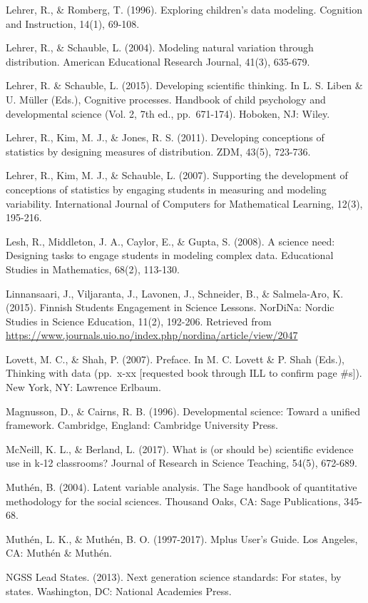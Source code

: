\documentclass[]{book}
\theoremstyle{definition}
\theoremstyle{definition}
\theoremstyle{definition}
\theoremstyle{remark}
\begin{document}
Lehrer, R., \& Romberg, T. (1996). Exploring children's data modeling.
Cognition and Instruction, 14(1), 69-108.

Lehrer, R., \& Schauble, L. (2004). Modeling natural variation through
distribution. American Educational Research Journal, 41(3), 635-679.

Lehrer, R. \& Schauble, L. (2015). Developing scientific thinking. In L.
S. Liben \& U. Müller (Eds.), Cognitive processes. Handbook of child
psychology and developmental science (Vol. 2, 7th ed., pp.~671-174).
Hoboken, NJ: Wiley.

Lehrer, R., Kim, M. J., \& Jones, R. S. (2011). Developing conceptions
of statistics by designing measures of distribution. ZDM, 43(5),
723-736.

Lehrer, R., Kim, M. J., \& Schauble, L. (2007). Supporting the
development of conceptions of statistics by engaging students in
measuring and modeling variability. International Journal of Computers
for Mathematical Learning, 12(3), 195-216.

Lesh, R., Middleton, J. A., Caylor, E., \& Gupta, S. (2008). A science
need: Designing tasks to engage students in modeling complex data.
Educational Studies in Mathematics, 68(2), 113-130.

Linnansaari, J., Viljaranta, J., Lavonen, J., Schneider, B., \&
Salmela-Aro, K. (2015). Finnish Students Engagement in Science Lessons.
NorDiNa: Nordic Studies in Science Education, 11(2), 192-206. Retrieved
from
\url{https://www.journals.uio.no/index.php/nordina/article/view/2047}

Lovett, M. C., \& Shah, P. (2007). Preface. In M. C. Lovett \& P. Shah
(Eds.), Thinking with data (pp.~x-xx {[}requested book through ILL to
confirm page \#s{]}). New York, NY: Lawrence Erlbaum.

Magnusson, D., \& Cairns, R. B. (1996). Developmental science: Toward a
unified framework. Cambridge, England: Cambridge University Press.

McNeill, K. L., \& Berland, L. (2017). What is (or should be) scientific
evidence use in k‐12 classrooms? Journal of Research in Science
Teaching, 54(5), 672-689.

Muthén, B. (2004). Latent variable analysis. The Sage handbook of
quantitative methodology for the social sciences. Thousand Oaks, CA:
Sage Publications, 345-68.

Muthén, L. K., \& Muthén, B. O. (1997-2017). Mplus User's Guide. Los
Angeles, CA: Muthén \& Muthén.

NGSS Lead States. (2013). Next generation science standards: For states,
by states. Washington, DC: National Academies Press.
\end{document}
